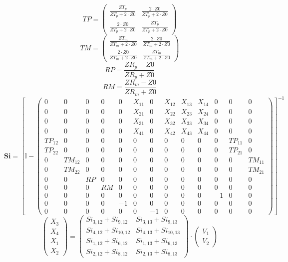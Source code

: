 \documentclass[10pt]{article} \usepackage{amsmath} \usepackage{bbold}
\begin{document}
\[ TP=\left(\begin{smallmatrix} \frac{ZT_p}{ZT_p+2\cdot Z0} &
\frac{2\cdot Z0}{ZT_p+2\cdot Z0} \\ \frac{2\cdot Z0}{ZT_p+2\cdot Z0} &
\frac{ZT_p}{ZT_p+2\cdot Z0} \end{smallmatrix}\right) \]
\[ TM=\left(\begin{smallmatrix} \frac{ZT_m}{ZT_m+2\cdot Z0} &
\frac{2\cdot Z0}{ZT_m+2\cdot Z0} \\ \frac{2\cdot Z0}{ZT_m+2\cdot Z0} &
\frac{ZT_m}{ZT_m+2\cdot Z0} \end{smallmatrix}\right) \]
\[ RP=\frac{ ZR_p -Z0}{ ZR_p +Z0} \]
\[ RM=\frac{ ZR_m -Z0}{ ZR_m +Z0} \]
\[ \mathbf{Si} = \left[ \mathbb{I}  - \left(\begin{smallmatrix} 0 & 0
& 0 & 0 & 0 & X_{11} & 0 & X_{12} & X_{13} & X_{14} & 0 & 0 & 0 \\ 0 &
0 & 0 & 0 & 0 & X_{21} & 0 & X_{22} & X_{23} & X_{24} & 0 & 0 & 0 \\ 0
& 0 & 0 & 0 & 0 & X_{31} & 0 & X_{32} & X_{33} & X_{34} & 0 & 0 & 0 \\
0 & 0 & 0 & 0 & 0 & X_{41} & 0 & X_{42} & X_{43} & X_{44} & 0 & 0 & 0
\\ TP_{12} & 0 & 0 & 0 & 0 & 0 & 0 & 0 & 0 & 0 & 0 & TP_{11} & 0 \\
TP_{22} & 0 & 0 & 0 & 0 & 0 & 0 & 0 & 0 & 0 & 0 & TP_{21} & 0 \\ 0 &
TM_{12} & 0 & 0 & 0 & 0 & 0 & 0 & 0 & 0 & 0 & 0 & TM_{11} \\ 0 &
TM_{22} & 0 & 0 & 0 & 0 & 0 & 0 & 0 & 0 & 0 & 0 & TM_{21} \\ 0 & 0 &
RP & 0 & 0 & 0 & 0 & 0 & 0 & 0 & 0 & 0 & 0 \\ 0 & 0 & 0 & RM & 0 & 0 &
0 & 0 & 0 & 0 & 0 & 0 & 0 \\ 0 & 0 & 0 & 0 & 0 & 0 & 0 & 0 & 0 & 0 &
-1 & 0 & 0 \\ 0 & 0 & 0 & 0 & -1 & 0 & 0 & 0 & 0 & 0 & 0 & 0 & 0 \\ 0
& 0 & 0 & 0 & 0 & 0 & -1 & 0 & 0 & 0 & 0 & 0 & 0
\end{smallmatrix}\right) \right]^{-1} \]
\[ \left(\begin{array}{c} X_{3} \\ X_{4} \\ X_{1} \\ X_{2}
\end{array}\right)=\left(\begin{smallmatrix} Si_{3,12} + Si_{9,12} &
Si_{3,13} + Si_{9,13} \\ Si_{4,12} + Si_{10,12} & Si_{4,13} +
Si_{10,13} \\ Si_{1,12} + Si_{6,12} & Si_{1,13} + Si_{6,13} \\
Si_{2,12} + Si_{8,12} & Si_{2,13} + Si_{8,13}
\end{smallmatrix}\right)\cdot \left(\begin{array}{c} V_{1} \\ V_{2}
\end{array}\right) \]
\end{document}
